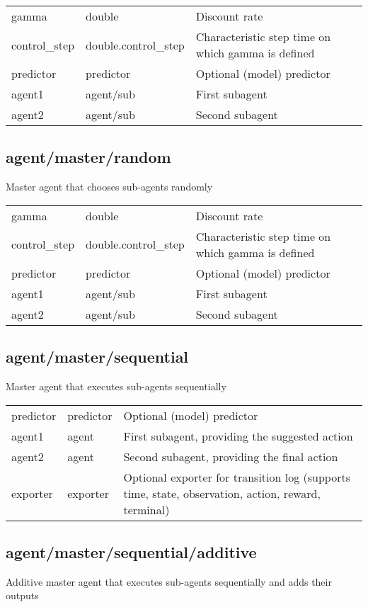 \noindent\begin{tabular}{@{}lll@{}}
gamma&double&Discount rate\\
control\_step&double.control\_step&Characteristic step time on which gamma is defined\\
predictor&predictor&Optional (model) predictor\\
agent1&agent/sub&First subagent\\
agent2&agent/sub&Second subagent\\
\end{tabular}
\subsection{agent/master/random}
\noindent Master agent that chooses sub-agents randomly\\

\noindent\begin{tabular}{@{}lll@{}}
gamma&double&Discount rate\\
control\_step&double.control\_step&Characteristic step time on which gamma is defined\\
predictor&predictor&Optional (model) predictor\\
agent1&agent/sub&First subagent\\
agent2&agent/sub&Second subagent\\
\end{tabular}
\subsection{agent/master/sequential}
\noindent Master agent that executes sub-agents sequentially\\

\noindent\begin{tabular}{@{}lll@{}}
predictor&predictor&Optional (model) predictor\\
agent1&agent&First subagent, providing the suggested action\\
agent2&agent&Second subagent, providing the final action\\
exporter&exporter&Optional exporter for transition log (supports time, state, observation, action, reward, terminal)\\
\end{tabular}
\subsection{agent/master/sequential/additive}
\noindent Additive master agent that executes sub-agents sequentially and adds their outputs\\

